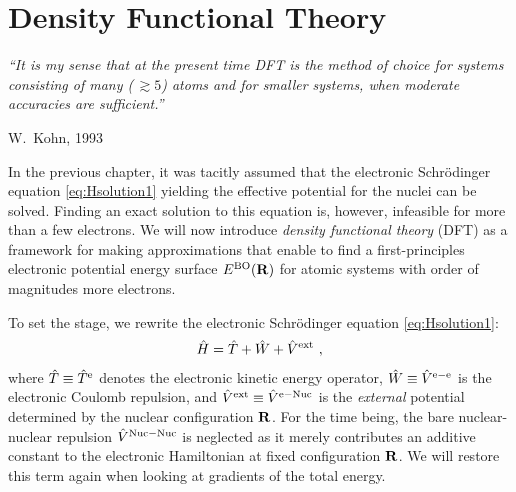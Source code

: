 \newpage
\section{Density Functional Theory}
\epigraph{\singlespacing \it ``It is my sense that at the present time DFT is the method of choice for systems consisting of many (\,$\gtrsim 5$) atoms and for smaller systems, when moderate accuracies are sufficient.''}{W.~Kohn, 1993}

In the previous chapter, it was tacitly assumed that the electronic Schr\"odinger equation \eqref{eq:Hsolution1} yielding the effective potential for the nuclei can be solved. Finding an exact solution to this equation is, however, infeasible for more than a few electrons. We will now introduce \emph{density functional theory} (DFT) as a framework for making approximations that enable to find a first-principles electronic potential energy surface $E^{\rm BO} ({\bf R})$ for atomic systems with order of magnitudes more electrons.

To set the stage, we rewrite the electronic Schr\"odinger equation \eqref{eq:Hsolution1}:
\begin{align}
	\hat H = \hat T + \hat W + \hat V^{\rm ext}~,
	\label{eq:H.dft.1}
\end{align}
where $\hat T \equiv \hat T^{\rm e}$ denotes the electronic kinetic energy operator, $\hat W \equiv \hat V^{\rm e-e}$ is the electronic Coulomb repulsion, and $\hat V^{\rm ext} \equiv \hat V^{\rm e-Nuc}$ is the \emph{external} potential determined by the nuclear configuration $\bf R$. For the time being, the bare nuclear-nuclear repulsion $\hat V^{\rm Nuc-Nuc}$ is neglected as it merely contributes an additive constant to the electronic Hamiltonian at fixed configuration $\bf R$. We will restore this term again when looking at gradients of the total energy.

